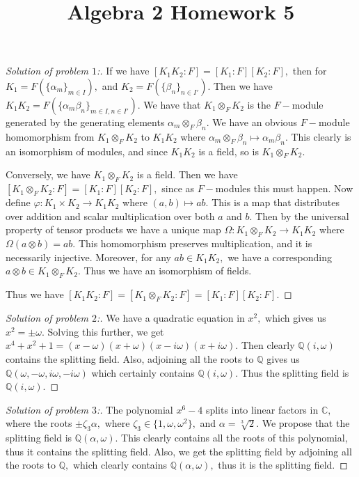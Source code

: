 \documentclass[letterpaper,11pt,twoside]{article}
\title{Algebra 2 Homework 5}
\theoremstyle{proposition}
\theoremstyle{definition}
\theoremstyle{theorem}
\theoremstyle{definition}
\theoremstyle{definition}
\theoremstyle{definition}
\theoremstyle{lemma}
\theoremstyle{definition}
\theoremstyle{definition}
\theoremstyle{corollary}
\theoremstyle{definition}
\theoremstyle{definition}
\theoremstyle{definition}
\begin{document}
	\maketitle
\begin{proof}[Solution of problem $1$:]
		If we have $[K_1K_2:F]=[K_1:F][K_2:F],$ then for $K_1=F(\{\alpha_m\}_{m \in I}),$ and $K_2=F(\{\beta_n\}_{n \in I'}).$ Then we have 
		$K_1K_2=F(\{\alpha_m \beta_n\}_{m \in I,n \in I'}).$ We have that $K_1 \otimes_F K_2$ is the $F-$module generated by the generating elements 
		$\alpha_m \otimes_F  \beta_n.$ We have an obvious $F-$module homomorphism from $ K_1 \otimes_F K_2$ to $K_1K_2$ where $\alpha_m \otimes_F  \beta_n 
		\mapsto \alpha_m\beta_n.$ This clearly is an isomorphism of modules, and since $K_1K_2$ is a field, so is $ K_1 \otimes_F K_2.$
		
		Conversely, we have $K_1 \otimes_F K_2$ is a field. Then we have $[K_1 \otimes_F K_2:F]=[K_1:F][K_2:F],$ since as $F-$modules this must happen. Now 
		define $\varphi: K_1 \times K_2 \to K_1K_2$ where $(a,b) \mapsto ab.$ This is a map that distributes over addition and scalar multiplication over 
		both $a$ and $b.$ Then by the universal property of tensor products we have a unique map $\Omega: K_1 \otimes_F K_2 \to K_1K_2$ where $\Omega(a 
		\otimes b)=ab.$ This homomorphism preserves multiplication, and it is necessarily injective. Moreover, for any $ab \in K_1K_2,$ we have a 
		corresponding $a \otimes b \in K_1 \otimes_F K_2.$ Thus we have an isomorphism of fields. 
		
		Thus we have $[K_1K_2:F]=[K_1 \otimes_F K_2:F]=[K_1:F][K_2:F].$  
\end{proof}
\begin{proof}[Solution of problem $2$:]
	We have a quadratic equation in $x^2,$ which gives us $x^2= \pm \omega.$ Solving this further, we get $x^4+x^2+1=(x-\omega)(x+ \omega)(x - i\omega)(x + 
	i\omega).$ Then clearly $\mathbb{Q}(i,\omega)$ contains the splitting field. Also, adjoining all the roots to $\mathbb{Q}$ gives us $\mathbb{Q}(\omega, 
	-\omega, i \omega, -i \omega)$ which certainly contains $\mathbb{Q}(i,\omega).$ Thus the splitting field is $\mathbb{Q}(i,\omega).$
\end{proof}
\begin{proof}[Solution of problem $3$:]
	The polynomial $x^6-4$ splits into linear factors in $\mathbb{C},$ where the roots $ \pm \zeta_3 \alpha,$ where $\zeta_3 \in \{1,\omega,\omega^2\},$ and 
	$\alpha=\sqrt[3]{2}.$ We propose that the splitting field is $\mathbb{Q}(\alpha, \omega).$ This clearly contains all the roots of this polynomial, thus 
	it contains the splitting field. Also, we get the splitting field by adjoining all the roots to $\mathbb{Q},$ which clearly contains $\mathbb{Q}(\alpha, 
	\omega),$ thus it is the splitting field. 
\end{proof}
\end{document}
